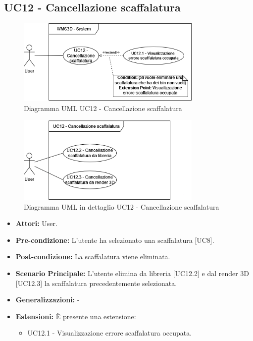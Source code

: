 \subsection{UC12 - Cancellazione scaffalatura}
\begin{figure}[H]
  \centering
  \includegraphics[width=0.8\textwidth]{UC_diagrams_11-20/UC12_sys.drawio.png}
   \caption{Diagramma UML UC12 - Cancellazione scaffalatura}
\end{figure}
\begin{figure}[H]
  \centering
  \includegraphics[width=0.8\textwidth]{UC_diagrams_11-20/UC12.drawio.png}
   \caption{Diagramma UML in dettaglio UC12 - Cancellazione scaffalatura}
\end{figure}
\begin{itemize}
    \item \textbf{Attori:} User.
    \item \textbf{Pre-condizione:} L'utente ha selezionato una scaffalatura [UC8].
    \item \textbf{Post-condizione:} La scaffalatura viene eliminata.
    \item \textbf{Scenario Principale:} L'utente elimina da libreria [UC12.2] e dal render 3D [UC12.3] la scaffalatura precedentemente selezionata.
    \item \textbf{Generalizzazioni:} -
    \item \textbf{Estensioni:} È presente una estensione:
    \begin{itemize}
        \item UC12.1 - Visualizzazione errore scaffalatura occupata.
    \end{itemize}
\end{itemize}


